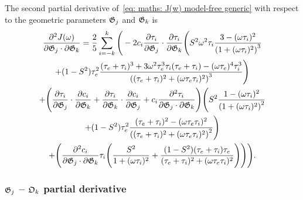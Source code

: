 The second partial derivative of~\eqref{eq: maths: J(w) model-free generic} with respect to the geometric parameters $\mathfrak{G}_j$ and $\mathfrak{G}_k$ is
\begin{multline}
    \frac{\partial^2 J(\omega)}{\partial \mathfrak{G}_j \cdot \partial \mathfrak{G}_k} = \frac{2}{5} \sum_{i=-k}^k \Bigg(
        -2 c_i \frac{\partial \tau_i}{\partial \mathfrak{G}_j} \cdot \frac{\partial \tau_i}{\partial \mathfrak{G}_k} \Bigg(
            S^2 \omega^2 \tau_i \frac{3 - (\omega \tau_i)^2}{\left(1 + (\omega \tau_i)^2 \right)^3}  \\
            + (1 - S^2) \tau_e^2 \frac{(\tau_e + \tau_i)^3  +  3 \omega^2 \tau_e^3 \tau_i (\tau_e + \tau_i)  -  (\omega \tau_e)^4 \tau_i^3}
                {\left((\tau_e + \tau_i)^2 + (\omega \tau_e \tau_i)^2 \right)^3}
        \Bigg) \\
        + \Bigg(
            \frac{\partial \tau_i}{\partial \mathfrak{G}_j} \cdot \frac{\partial c_i}{\partial \mathfrak{G}_k}
            + \frac{\partial \tau_i}{\partial \mathfrak{G}_k} \cdot \frac{\partial c_i}{\partial \mathfrak{G}_j}
            + c_i \frac{\partial^2 \tau_i}{\partial \mathfrak{G}_j \cdot \partial \mathfrak{G}_k}
        \Bigg)
        \Bigg(
            S^2 \frac{1 - (\omega \tau_i)^2}{\left(1 + (\omega \tau_i)^2 \right)^2} \\
            + (1 - S^2) \tau_e^2 \frac{(\tau_e + \tau_i)^2 - (\omega \tau_e \tau_i)^2}{\left((\tau_e + \tau_i)^2 + (\omega \tau_e \tau_i)^2 \right)^2}
        \Bigg) \\
        + \Bigg(
            \frac{\partial^2 c_i}{\partial \mathfrak{G}_j \cdot \partial \mathfrak{G}_k} \tau_i \Bigg(
                \frac{S^2}{1 + (\omega \tau_i)^2}
                + \frac{(1 - S^2)(\tau_e + \tau_i)\tau_e}{(\tau_e + \tau_i)^2 + (\omega \tau_e \tau_i)^2}
            \Bigg)
        \Bigg)
    \Bigg).
\end{multline}
                


\subsubsection{$\mathfrak{G}_j$ -- $\mathfrak{O}_k$ partial derivative}

